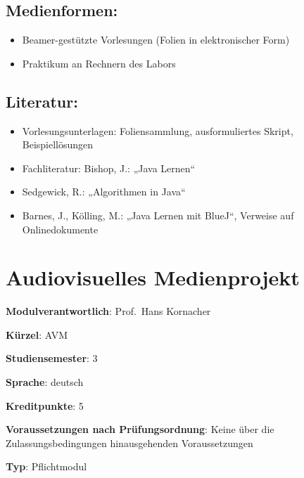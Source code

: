 \section*{Medienformen:}\label{medienformen-1}

\begin{itemize}
\tightlist
\item
  Beamer-gestützte Vorlesungen (Folien in elektronischer Form)
\item
  Praktikum an Rechnern des Labors
\end{itemize}

\section*{Literatur:}\label{literatur-1}

\begin{itemize}
\tightlist
\item
  Vorlesungsunterlagen: Foliensammlung, ausformuliertes Skript,
  Beispiellösungen
\item
  Fachliteratur: Bishop, J.: „Java Lernen``
\item
  Sedgewick, R.: „Algorithmen in Java``
\item
  Barnes, J., Kölling, M.: „Java Lernen mit BlueJ``, Verweise auf
  Onlinedokumente
\end{itemize}

\chapter{Audiovisuelles
Medienprojekt}\label{audiovisuelles-medienprojekt}

\begin{modulHead}
\textbf{Modulverantwortlich}: Prof.~Hans
Kornacher
\end{modulHead}
\begin{modulHead}
\textbf{Kürzel}:
AVM
\end{modulHead}
\begin{modulHead}
\textbf{Studiensemester}:
3
\end{modulHead}
\begin{modulHead}
\textbf{Sprache}:
deutsch
\end{modulHead}
\begin{modulHead}
\textbf{Kreditpunkte}:
5
\end{modulHead}
\begin{modulHead}
\textbf{Voraussetzungen nach
Prüfungsordnung}: Keine über die Zulassungsbedingungen hinausgehenden
Voraussetzungen
\end{modulHead}
\begin{modulHead}
\textbf{Typ}:
Pflichtmodul
\end{modulHead}


